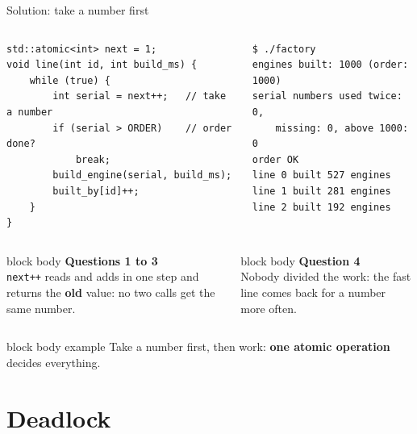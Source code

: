 \documentclass[aspectratio=169,10pt]{beamer}
\newcommand{\stepbox}[2]{%
  \begin{beamercolorbox}[rounded=true,sep=0.09cm,wd=\linewidth]{block body}
    \footnotesize\textbf{#1}\\ #2
  \end{beamercolorbox}\vspace{0.06cm}}
\newcommand{\keymsg}[1]{%
  \begin{beamercolorbox}[rounded=true,sep=0.1cm,wd=\textwidth]{block body example}
    \centering\footnotesize #1
  \end{beamercolorbox}}
\begin{document}
\begin{frame}[fragile]{Solution: take a number first}
  \begin{columns}[T,onlytextwidth]
\begin{lstlisting}[style=cpp]
std::atomic<int> next = 1;
void line(int id, int build_ms) {
    while (true) {
        int serial = next++;   // take a number
        if (serial > ORDER)    // order done?
            break;
        build_engine(serial, build_ms);
        built_by[id]++;
    }
}
\end{lstlisting}
\begin{lstlisting}[style=term]
$ ./factory
engines built: 1000 (order: 1000)
serial numbers used twice: 0,
    missing: 0, above 1000: 0
order OK
line 0 built 527 engines
line 1 built 281 engines
line 2 built 192 engines
\end{lstlisting}
  \end{columns}
  \vfill
  \begin{columns}[T,onlytextwidth]
      \stepbox{Questions 1 to 3}{\texttt{next++} reads and adds in one step and returns the \textbf{old}
        value: no two calls get the same number.}
      \stepbox{Question 4}{Nobody divided the work: the fast line comes back for a number more often.}
  \end{columns}
  \vfill
  \keymsg{Take a number first, then work: \textbf{one atomic operation} decides everything.}
\end{frame}

\section{Deadlock}
\end{document}
